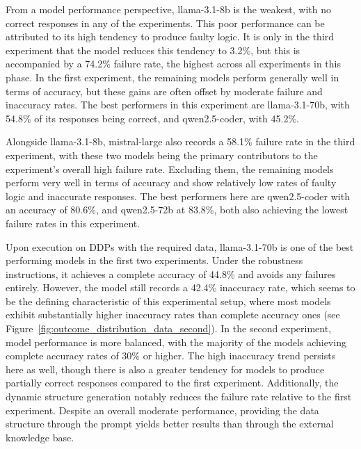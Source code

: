 \documentclass{DESSThesis}
\begin{document}
From a model performance perspective, llama-3.1-8b is the weakest, with no correct responses in any of the experiments. This poor performance can be attributed to its high tendency to produce faulty logic. It is only in the third experiment that the model reduces this tendency to 3.2\%, but this is accompanied by a 74.2\% failure rate, the highest across all experiments in this phase. In the first experiment, the remaining models perform generally well in terms of accuracy, but these gains are often offset by moderate failure and inaccuracy rates. The best performers in this experiment are llama-3.1-70b, with 54.8\% of its responses being correct, and qwen2.5-coder, with 45.2\%.

Alongside llama-3.1-8b, mistral-large also records a 58.1\% failure rate in the third experiment, with these two models being the primary contributors to the experiment's overall high failure rate. Excluding them, the remaining models perform very well in terms of accuracy and show relatively low rates of faulty logic and inaccurate responses. The best performers here are qwen2.5-coder with an accuracy of 80.6\%, and qwen2.5-72b at 83.8\%, both also achieving the lowest failure rates in this experiment.

Upon execution on DDPs with the required data, llama-3.1-70b is one of the best performing models in the first two experiments. Under the robustness instructions, it achieves a complete accuracy of 44.8\% and avoids any failures entirely. However, the model still records a 42.4\% inaccuracy rate, which seems to be the defining characteristic of this experimental setup, where most models exhibit substantially higher inaccuracy rates than complete accuracy ones (see Figure~\ref{fig:outcome_distribution_data_second}). In the second experiment, model performance is more balanced, with the majority of the models achieving complete accuracy rates of 30\% or higher. The high inaccuracy trend persists here as well, though there is also a greater tendency for models to produce partially correct responses compared to the first experiment. Additionally, the dynamic structure generation notably reduces the failure rate relative to the first experiment. Despite an overall moderate performance, providing the data structure through the prompt yields better results than through the external knowledge base.
\end{document}

